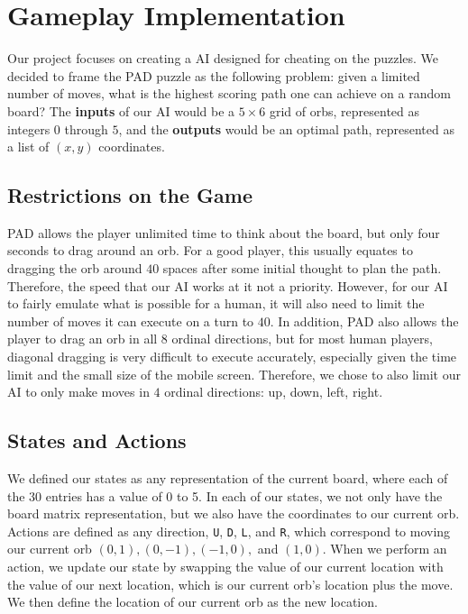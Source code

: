 \documentclass[journal,final,letterpaper,11pt]{IEEEtran}
\begin{document}
\section{Gameplay Implementation}
Our project focuses on creating a AI designed for cheating on the puzzles. We decided to frame the PAD puzzle as the following problem: given a limited number of moves, what is the highest scoring path one can achieve on a random board? The \textbf{inputs} of our AI would be a $5 \times 6$ grid of orbs, represented as integers $0$ through $5$, and the \textbf{outputs} would be an optimal path, represented as a list of $(x,y)$ coordinates.

\subsection{Restrictions on the Game}
PAD allows the player unlimited time to think about the board, but only four seconds to drag around an orb. For a good player, this usually equates to dragging the orb around $40$ spaces after some initial thought to plan the path. Therefore, the speed that our AI works at it not a priority. However, for our AI to fairly emulate what is possible for a human, it will also need to limit the number of moves it can execute on a turn to $40$. In addition, PAD also allows the player to drag an orb in all $8$ ordinal directions, but for most human players, diagonal dragging is very difficult to execute accurately, especially given the time limit and the small size of the mobile screen. Therefore, we chose to also limit our AI to only make moves in $4$ ordinal directions: up, down, left, right.

\subsection{States and Actions}
We defined our states as any representation of the current board, where each of the 30 entries has a value of 0 to 5. In each of our states, we not only have the board matrix representation, but we also have the coordinates to our current orb. Actions are defined as any direction, \texttt{U}, \texttt{D}, \texttt{L}, and \texttt{R}, which correspond to moving our current orb $(0, 1), (0, -1), (-1, 0), $ and $(1, 0)$. When we perform an action, we update our state by swapping the value of our current location with the value of our next location, which is our current orb's location plus the move. We then define the location of our current orb as the new location.
\end{document}
